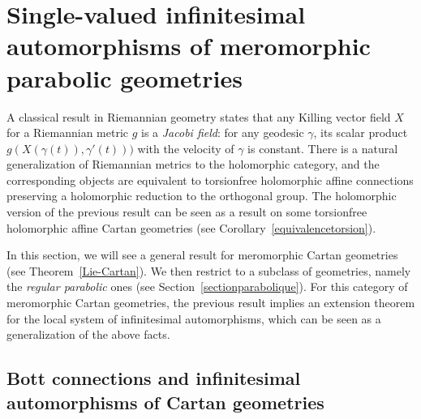 \documentclass[pdftex]{sigma}
\numberwithin{equation}{section}
\begin{document}
\section{Single-valued infinitesimal automorphisms of meromorphic \allowbreak parabolic geometries}\label{killparab}
A classical result in Riemannian geometry states that any Killing vector field $X$ for a Riemannian metric $g$ is a \textit{Jacobi field}: for any geodesic $\gamma$, its scalar product $g(X(\gamma(t)),\gamma'(t)))$ with the velocity of $\gamma$ is constant. There is a natural generalization of Riemannian metrics to the holomorphic category, and the corresponding objects are equivalent to torsionfree holomorphic affine connections preserving a holomorphic reduction to the orthogonal group. The holomorphic version of the previous result can be seen as a result on some torsionfree holomorphic affine Cartan geometries (see Corollary~\ref{equivalencetorsion}).

In this section, we will see a general result for meromorphic Cartan geometries (see Theorem~\ref{Lie-Cartan}). We then restrict to a subclass of geometries, namely the \textit{regular parabolic} ones (see Section~\ref{sectionparabolique}). For this category of meromorphic Cartan geometries, the previous result implies an extension theorem for the local system of infinitesimal automorphisms, which can be seen as a generalization of the above facts.


\subsection{Bott connections and infinitesimal automorphisms of Cartan geometries}\label{sectionBott}
\end{document}

